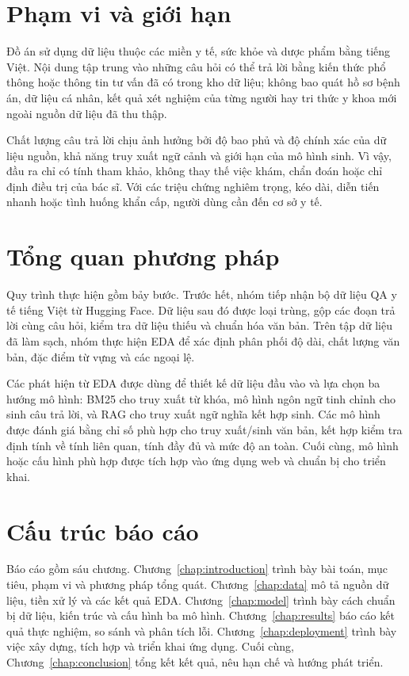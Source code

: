\documentclass[12pt,a4paper,oneside]{report}
\begin{document}
\section{Phạm vi và giới hạn}
Đồ án sử dụng dữ liệu thuộc các miền y tế, sức khỏe và dược phẩm bằng tiếng Việt. Nội dung tập trung vào những câu hỏi có thể trả lời bằng kiến thức phổ thông hoặc thông tin tư vấn đã có trong kho dữ liệu; không bao quát hồ sơ bệnh án, dữ liệu cá nhân, kết quả xét nghiệm của từng người hay tri thức y khoa mới ngoài nguồn dữ liệu đã thu thập.

Chất lượng câu trả lời chịu ảnh hưởng bởi độ bao phủ và độ chính xác của dữ liệu nguồn, khả năng truy xuất ngữ cảnh và giới hạn của mô hình sinh. Vì vậy, đầu ra chỉ có tính tham khảo, không thay thế việc khám, chẩn đoán hoặc chỉ định điều trị của bác sĩ. Với các triệu chứng nghiêm trọng, kéo dài, diễn tiến nhanh hoặc tình huống khẩn cấp, người dùng cần đến cơ sở y tế.

\section{Tổng quan phương pháp}
Quy trình thực hiện gồm bảy bước. Trước hết, nhóm tiếp nhận bộ dữ liệu QA y tế tiếng Việt từ Hugging Face. Dữ liệu sau đó được loại trùng, gộp các đoạn trả lời cùng câu hỏi, kiểm tra dữ liệu thiếu và chuẩn hóa văn bản. Trên tập dữ liệu đã làm sạch, nhóm thực hiện EDA để xác định phân phối độ dài, chất lượng văn bản, đặc điểm từ vựng và các ngoại lệ.

Các phát hiện từ EDA được dùng để thiết kế dữ liệu đầu vào và lựa chọn ba hướng mô hình: BM25 cho truy xuất từ khóa, mô hình ngôn ngữ tinh chỉnh cho sinh câu trả lời, và RAG cho truy xuất ngữ nghĩa kết hợp sinh. Các mô hình được đánh giá bằng chỉ số phù hợp cho truy xuất/sinh văn bản, kết hợp kiểm tra định tính về tính liên quan, tính đầy đủ và mức độ an toàn. Cuối cùng, mô hình hoặc cấu hình phù hợp được tích hợp vào ứng dụng web và chuẩn bị cho triển khai.

\section{Cấu trúc báo cáo}
Báo cáo gồm sáu chương. Chương~\ref{chap:introduction} trình bày bài toán, mục tiêu, phạm vi và phương pháp tổng quát. Chương~\ref{chap:data} mô tả nguồn dữ liệu, tiền xử lý và các kết quả EDA. Chương~\ref{chap:model} trình bày cách chuẩn bị dữ liệu, kiến trúc và cấu hình ba mô hình. Chương~\ref{chap:results} báo cáo kết quả thực nghiệm, so sánh và phân tích lỗi. Chương~\ref{chap:deployment} trình bày việc xây dựng, tích hợp và triển khai ứng dụng. Cuối cùng, Chương~\ref{chap:conclusion} tổng kết kết quả, nêu hạn chế và hướng phát triển.
\end{document}
